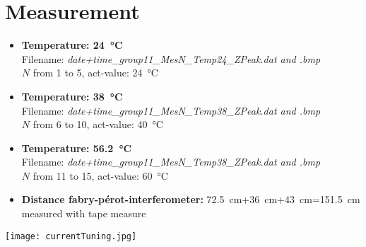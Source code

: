 \section*{Measurement}
\begin{itemize}
    \item \textbf{Temperature: \SI{24}{\celsius}} \\ 
    Filename: \textit{date+time\_group11\_MesN\_Temp24\_ZPeak.dat and .bmp}\\ $N$ from 1 to 5, act-value: \SI{24}{\celsius}
    \item \textbf{Temperature: \SI{38}{\celsius}} \\ 
    Filename: \textit{date+time\_group11\_MesN\_Temp38\_ZPeak.dat and .bmp}\\ $N$ from 6 to 10, act-value: \SI{40}{\celsius}
    \item \textbf{Temperature: \SI{56,2}{\celsius}} \\ 
    Filename: \textit{date+time\_group11\_MesN\_Temp38\_ZPeak.dat and .bmp}\\ $N$ from 11 to 15, act-value: \SI{60}{\celsius}
    \item \textbf{Distance fabry-pérot-interferometer:} \SI{72,5}{\centi\metre}+\SI{36}{\centi\metre}+\SI{43}{\centi\metre}=\SI{151,5}{\centi\metre}\\ measured with tape measure
\end{itemize}

\begin{center}
    \texttt{[image: currentTuning.jpg]}
    \label{image:currentTuning}
\end{center}